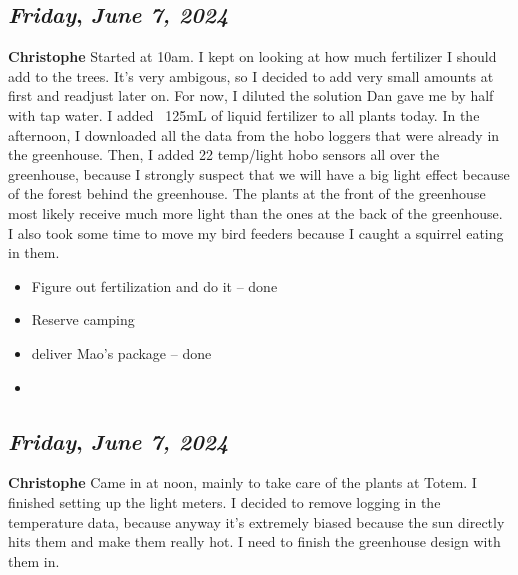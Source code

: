 \def\day{\textit{June 7, 2024}}
\def\weekday{\textit{Friday}}
\subsection*{\weekday, \day}
\textbf {Christophe}
Started at 10am. I kept on looking at how much fertilizer I should add to the trees. It's very ambigous, so I decided to add very small amounts at first and readjust later on. For now, I diluted the solution Dan gave me by half with tap water. I added ~125mL of liquid fertilizer to all plants today. In the afternoon, I downloaded all the data from the hobo loggers that were already in the greenhouse. Then, I added 22 temp/light hobo sensors all over the greenhouse, because I strongly suspect that we will have a big light effect because of the forest behind the greenhouse. The plants at the front of the greenhouse most likely receive much more light than the ones at the back of the greenhouse. I also took some time to move my bird feeders because I caught a squirrel eating in them. 
\begin{itemize}
	\item Figure out fertilization and do it -- done
	\item Reserve camping
	\item deliver Mao's package -- done
	\item
\end{itemize}

\def\day{\textit{June 7, 2024}}
\def\weekday{\textit{Friday}}
\subsection*{\weekday, \day}
\textbf {Christophe}
Came in at noon, mainly to take care of the plants at Totem. I finished setting up the light meters. I decided to remove logging in the temperature data,  because anyway it's extremely biased because the sun directly hits them and make them really hot. I need to finish the greenhouse design with them in. 

\def\day{\textit{June 10, 2024}}
\def\weekday{\textit{Monday}}

